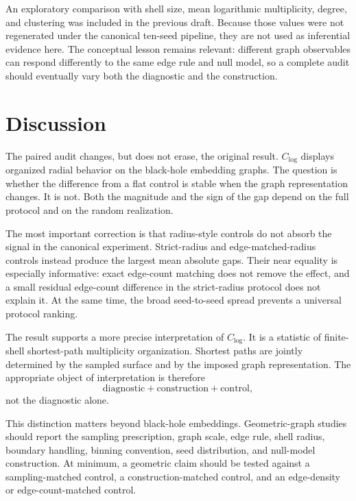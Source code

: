 \documentclass[11pt]{article}
\newcommand{\clog}{C_{\log}}
\begin{document}
An exploratory comparison with shell size, mean logarithmic multiplicity,
degree, and clustering was included in the previous draft. Because those values
were not regenerated under the canonical ten-seed pipeline, they are not used as
inferential evidence here. The conceptual lesson remains relevant: different
graph observables can respond differently to the same edge rule and null model,
so a complete audit should eventually vary both the diagnostic and the
construction.

\section{Discussion}

The paired audit changes, but does not erase, the original result. $\clog$
displays organized radial behavior on the black-hole embedding graphs. The
question is whether the difference from a flat control is stable when the graph
representation changes. It is not. Both the magnitude and the sign of the gap
depend on the full protocol and on the random realization.

The most important correction is that radius-style controls do not absorb the
signal in the canonical experiment. Strict-radius and edge-matched-radius
controls instead produce the largest mean absolute gaps. Their near equality is
especially informative: exact edge-count matching does not remove the effect,
and a small residual edge-count difference in the strict-radius protocol does
not explain it. At the same time, the broad seed-to-seed spread prevents a
universal protocol ranking.

The result supports a more precise interpretation of $\clog$. It is a statistic
of finite-shell shortest-path multiplicity organization. Shortest paths are
jointly determined by the sampled surface and by the imposed graph
representation. The appropriate object of interpretation is therefore
\begin{equation}
    \text{diagnostic} + \text{construction} + \text{control},
\end{equation}
not the diagnostic alone.

This distinction matters beyond black-hole embeddings. Geometric-graph studies
should report the sampling prescription, graph scale, edge rule, shell radius,
boundary handling, binning convention, seed distribution, and null-model
construction. At minimum, a geometric claim should be tested against a
sampling-matched control, a construction-matched control, and an edge-density
or edge-count-matched control.
\end{document}
